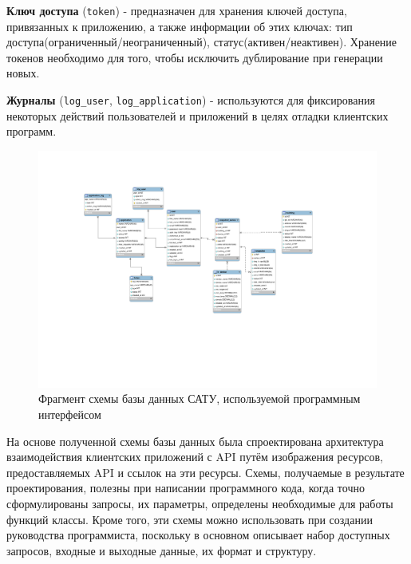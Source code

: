 	\textbf{Ключ доступа} (\texttt{token}) - предназначен для хранения ключей доступа, привязанных к приложению, а также информации об этих ключах: тип доступа(ограниченный/неограниченный), статус(активен/неактивен). Хранение токенов необходимо для того, чтобы исключить дублирование при генерации новых.

	\textbf{Журналы} (\texttt{log\_user}, \texttt{log\_application}) - используются для фиксирования некоторых действий пользователей и приложений в целях отладки клиентских программ.

	\pagebreak

	\begin{landscape}

		\begin{figure}[t!]
		      \centering
		      \includegraphics[width=1.3\textwidth]{images/erd/1}
		      \caption{Фрагмент схемы базы данных САТУ, используемой программным интерфейсом}
		      \label{erd:1}
		\end{figure}

	\end{landscape}

	\pagebreak

	На основе полученной схемы базы данных была спроектирована архитектура взаимодействия клиентских приложений с API путём изображения ресурсов, предоставляемых API и ссылок на эти ресурсы. Схемы, получаемые в результате проектирования, полезны при написании программного кода, когда точно сформулированы запросы, их параметры, определены необходимые для работы функций классы. Кроме того, эти схемы можно использовать при создании руководства программиста, поскольку в основном описывает набор доступных запросов, входные и выходные данные, их формат и структуру.

